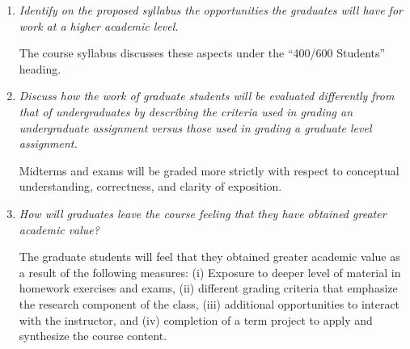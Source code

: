 \documentclass[11pt,onecolumn]{article}
\begin{document}
\begin{enumerate}
\item \emph{Identify on the proposed syllabus the opportunities the graduates will have for work at a higher academic level.}

  The course syllabus discusses these aspects under the ``400/600 Students'' heading. 

\item \emph{Discuss how the work of graduate students will be evaluated differently from that of undergraduates by describing the criteria used in grading an undergraduate assignment versus those used in grading a graduate level assignment.}

  Midterms and exams will be graded more strictly with respect to conceptual understanding, correctness, and clarity of exposition. 

\item \emph{How will graduates leave the course feeling that they have obtained greater academic value?}

The graduate students will feel that they obtained greater academic value as a result of the following measures: (i) Exposure to deeper level of material in homework exercises and exams, (ii) different grading criteria that emphasize the research component of the class, (iii) additional opportunities to interact with the instructor, and (iv) completion of a term project to apply and synthesize the course content.
  
\end{enumerate}
\end{document}
